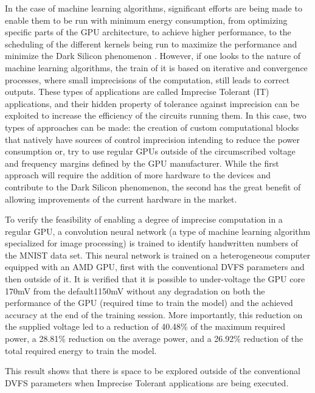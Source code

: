 In the case of machine learning algorithms, significant efforts are being made to enable them to be run with minimum energy consumption, from optimizing specific parts of the GPU architecture, to achieve higher performance, to the scheduling of the different kernels being run to maximize the performance and minimize the Dark Silicon phenomenon \cite{esmaeilzadeh_dark_2011}. However, if one looks to the nature of machine learning algorithms, the train of it is based on iterative and convergence processes, where small imprecisions of the computation, still leads to correct outputs. These types of applications are called Imprecise Tolerant (IT) applications, and their hidden property of tolerance against imprecision can be exploited to increase the efficiency of the circuits running them. In this case, two types of approaches can be made: the creation of custom computational blocks that natively have sources of control imprecision intending to reduce the power consumption \cite{mahdiani_efficient_2017} or, try to use regular GPUs outside of the circumscribed voltage and frequency margins defined by the GPU manufacturer. While the first approach will require the addition of more hardware to the devices and contribute to the Dark Silicon phenomenon, the second has the great benefit of allowing improvements of the current hardware in the market. 

To verify the feasibility of enabling a degree of imprecise computation in a regular GPU, a convolution neural network (a type of machine learning algorithm specialized for image processing) is trained to identify handwritten numbers of the MNIST data set. This neural network is trained on a heterogeneous computer equipped with an AMD GPU, first with the conventional DVFS parameters and then outside of it. It is verified that it is possible to under-voltage the GPU core 170mV from the default1150mV without any degradation on both the performance of the GPU (required time to train the model) and the achieved accuracy at the end of the training session. More importantly, this reduction on the supplied voltage led to a reduction of 40.48\% of the maximum required power, a 28.81\% reduction on the average power, and a 26.92\% reduction of the total required energy to train the model.

This result shows that there is space to be explored outside of the conventional DVFS parameters when Imprecise Tolerant applications are being executed.


